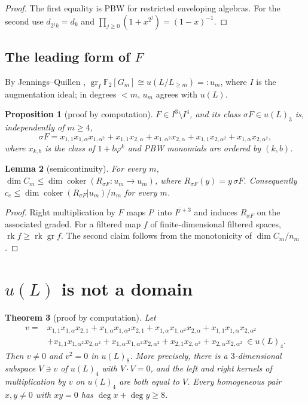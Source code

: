 \documentclass[11pt]{amsart}
\newtheorem{theorem}{Theorem}[section]
\newtheorem{proposition}[theorem]{Proposition}
\newtheorem{lemma}[theorem]{Lemma}
\theoremstyle{definition}
\newcommand{\F}{\mathbb{F}}
\newcommand{\gr}{\operatorname{gr}}
\newcommand{\rk}{\operatorname{rk}}
\newcommand{\coker}{\operatorname{coker}}
\begin{document}
\begin{proof}
The first equality is PBW for restricted enveloping algebras. For the second use $d_{2^jk}=d_k$ and
$\prod_{j\ge0}(1+x^{2^j})=(1-x)^{-1}$.
\end{proof}

\subsection{The leading form of $F$}
By Jennings--Quillen \cite{Jennings,Quillen}, $\gr_I\F_2[G_m]\cong u(L/L_{\ge m})=:u_m$, where $I$ is the augmentation
ideal; in degrees $<m$, $u_m$ agrees with $u(L)$.

\begin{proposition}[proof by computation]\label{prop:sigmaF}
$F\in I^3\setminus I^4$, and its class $\sigma F\in u(L)_3$ is, independently of $m\ge4$,
\[
  \sigma F=x_{1,1}x_{1,\alpha}x_{1,\alpha^2}+x_{1,1}x_{2,\alpha}+x_{1,\alpha^2}x_{2,\alpha}+x_{1,1}x_{2,\alpha^2}+x_{1,\alpha}x_{2,\alpha^2},
\]
where $x_{k,b}$ is the class of $1+b\varphi^k$ and PBW monomials are ordered by $(k,b)$.
\end{proposition}

\begin{lemma}[semicontinuity]\label{lem:semicont}
For every $m$, $\dim C_m\le\dim\coker(R_{\sigma F}:u_m\to u_m)$, where $R_{\sigma F}(y)=y\,\sigma F$.
Consequently $c_e\le \dim\coker(R_{\sigma F}|u_m)/n_m$ for every $m$.
\end{lemma}

\begin{proof}
Right multiplication by $F$ maps $I^j$ into $I^{j+3}$ and induces $R_{\sigma F}$ on the associated graded.
For a filtered map $f$ of finite-dimensional filtered spaces, $\rk f\ge\rk\gr f$. The second claim follows from the
monotonicity of $\dim C_m/n_m$ \cite[Prop.~6.8.3]{ChenIII}.
\end{proof}

\section{$u(L)$ is not a domain}\label{sec:zd}

\begin{theorem}[proof by computation]\label{thm:zd}
Let
\begin{align*}
v={}&x_{1,1}x_{1,\alpha}x_{2,1}+x_{1,\alpha}x_{1,\alpha^2}x_{2,1}+x_{1,\alpha}x_{1,\alpha^2}x_{2,\alpha}
     +x_{1,1}x_{1,\alpha}x_{2,\alpha^2}\\
   &+x_{1,1}x_{1,\alpha^2}x_{2,\alpha^2}+x_{1,\alpha}x_{1,\alpha^2}x_{2,\alpha^2}+x_{2,1}x_{2,\alpha^2}+x_{2,\alpha}x_{2,\alpha^2}
   \ \in u(L)_4 .
\end{align*}
Then $v\neq0$ and $v^2=0$ in $u(L)_8$. More precisely, there is a $3$-dimensional subspace $V\ni v$ of $u(L)_4$ with
$V\cdot V=0$, and the left and right kernels of multiplication by $v$ on $u(L)_4$ are both equal to $V$.
Every homogeneous pair $x,y\ne0$ with $xy=0$ has $\deg x+\deg y\ge 8$.
\end{theorem}
\end{document}
